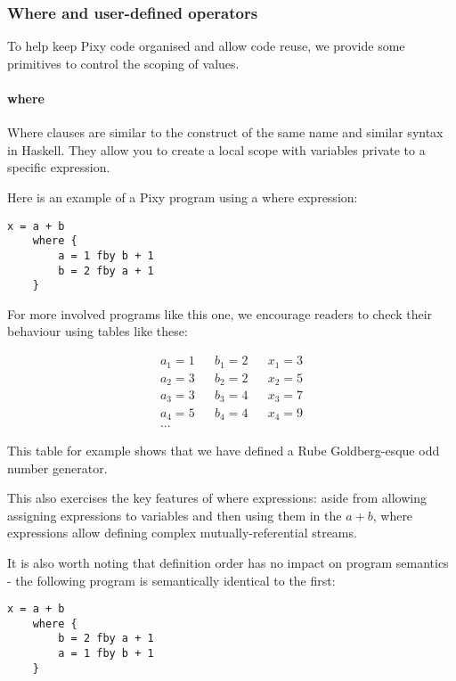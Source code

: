 \documentclass{scrartcl}
\begin{document}
    \subsubsection{Where and user-defined operators}
    
    To help keep Pixy code organised and allow code reuse, we provide some primitives to control the scoping of values.
    
    \paragraph{where}
    
    Where clauses are similar to the construct of the same name and similar syntax in Haskell. They allow you to create a local scope with variables private to a specific expression.
    
    Here is an example of a Pixy program using a where expression:
    
    \begin{lstlisting}
x = a + b
    where {
        a = 1 fby b + 1
        b = 2 fby a + 1
    }
    \end{lstlisting}
    
    For more involved programs like this one, we encourage readers to check their behaviour using tables like these:
    
    \begin{align*}
    a_1 = 1 && b_1 = 2 && x_1 = 3 \\
    a_2 = 3 && b_2 = 2 && x_2 = 5 \\
    a_3 = 3 && b_3 = 4 && x_3 = 7 \\
    a_4 = 5 && b_4 = 4 && x_4 = 9 \\
    ...
    \end{align*}
    
    This table for example shows that we have defined a Rube Goldberg-esque odd number generator.
    
    This also exercises the key features of where expressions: aside from allowing assigning expressions to variables and then using them in the $a+b$, where expressions allow defining complex mutually-referential streams.
    
    It is also worth noting that definition order has no impact on program semantics - the following program is semantically identical to the first:
    
    \begin{lstlisting}
x = a + b
    where {
        b = 2 fby a + 1
        a = 1 fby b + 1
    }
    \end{lstlisting}
    
\end{document}
